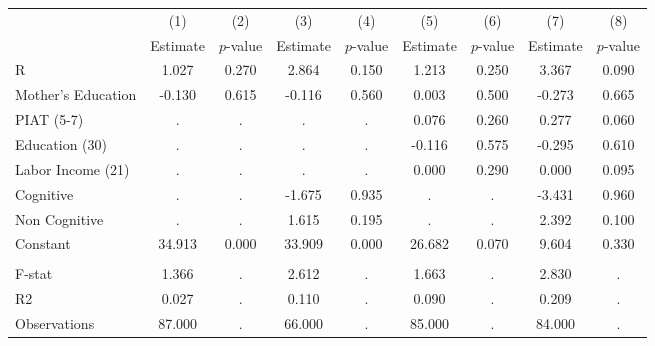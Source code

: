 \begin{tabular}{lcccccccc} \toprule
 & (1) & (2) & (3) & (4) & (5) & (6) & (7) & (8) \\ 
 & Estimate  & $p$-value  & Estimate  & $p$-value  & Estimate  & $p$-value  & Estimate  & $p$-value  \\  \midrule
R &     1.027 &     0.270 &     2.864 &     0.150 &     1.213 &     0.250 &     3.367 &     0.090 \\  
Mother's Education &    -0.130 &     0.615 &    -0.116 &     0.560 &     0.003 &     0.500 &    -0.273 &     0.665 \\  
PIAT (5-7) &         . &         . &         . &         . &     0.076 &     0.260 &     0.277 &     0.060 \\  
Education (30) &         . &         . &         . &         . &    -0.116 &     0.575 &    -0.295 &     0.610 \\  
Labor Income (21) &         . &         . &         . &         . &     0.000 &     0.290 &     0.000 &     0.095 \\  
Cognitive &         . &         . &    -1.675 &     0.935 &         . &         . &    -3.431 &     0.960 \\  
Non Cognitive &         . &         . &     1.615 &     0.195 &         . &         . &     2.392 &     0.100 \\  
Constant &    34.913 &     0.000 &    33.909 &     0.000 &    26.682 &     0.070 &     9.604 &     0.330 \\  \\ \midrule
F-stat &     1.366 &         . &     2.612 &         . &     1.663 &         . &     2.830 &         . \\  
R2 &     0.027 &         . &     0.110 &         . &     0.090 &         . &     0.209 &         . \\  
Observations &    87.000 &         . &    66.000 &         . &    85.000 &         . &    84.000 &         . \\  
\bottomrule \end{tabular}
